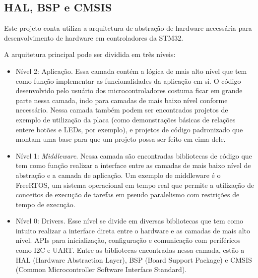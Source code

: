 \subsection{HAL, BSP e CMSIS}
Este projeto conta utiliza a arquitetura de abstração de hardware necessária para desenvolvimento de hardware em controladores da STM32. 

A arquitetura principal pode ser dividida em três níveis:
\begin{itemize}
    \item Nível 2: Aplicação. Essa camada contém a lógica de mais alto nível que tem como função implementar as funcionalidades da aplicação em si. O código desenvolvido pelo usuário dos microcontroladores costuma ficar em grande parte nessa camada, indo para camadas de mais baixo nível conforme necessário. Nessa camada também podem ser encontrados projetos de exemplo de utilização da placa (como demonstrações básicas de relações entere botões e LEDs, por exemplo), e projetos de código padronizado que montam uma base para que um projeto possa ser feito em cima dele.

    \item Nível 1: \textit{Middleware}. Nessa camada são encontradas bibliotecas de código que tem como função realizar a interface entre as camadas de mais baixo nível de abstração e a camada de aplicação. Um exemplo de middleware é o FreeRTOS, um sistema operacional em tempo real que permite a utilização de conceitos de execução de tarefas em pseudo paralelismo com restrições de tempo de execução.

    \item Nível 0: Drivers. Esse nível se divide em diversas bibliotecas que tem como intuito realizar a interface direta entre o hardware e as camadas de mais alto nível. APIs para inicialização, configuração e comunicação com periféricos como I2C e UART. Entre as bibliotecas encontradas nessa camada, estão a HAL (Hardware Abstraction Layer), BSP (Board Support Package) e CMSIS (Common Microcontroller Software Interface Standard).
\end{itemize}


